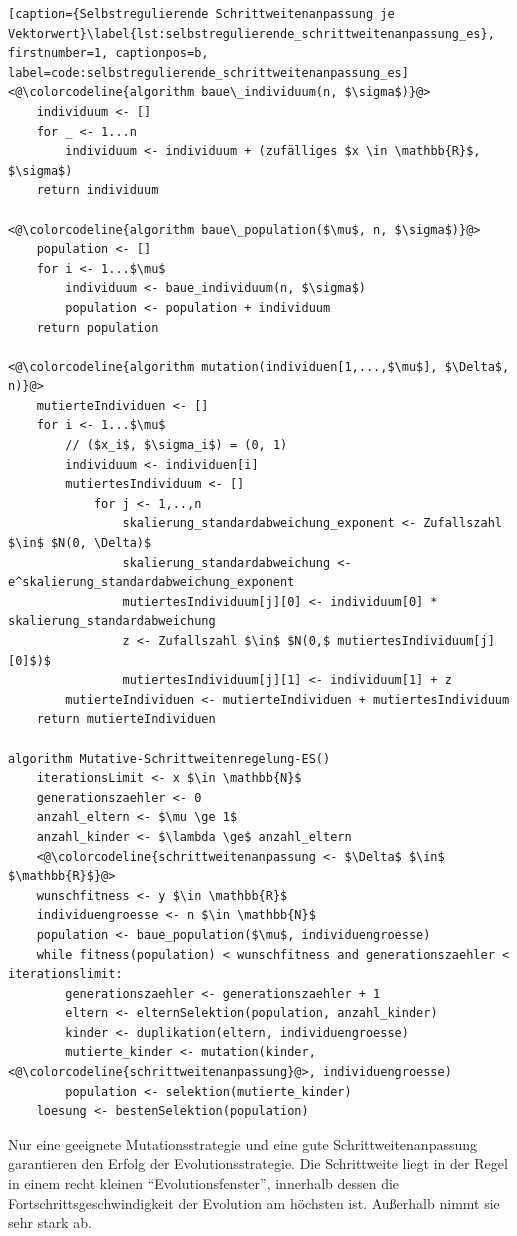 \begin{lstlisting}[caption={Selbstregulierende Schrittweitenanpassung je Vektorwert}\label{lst:selbstregulierende_schrittweitenanpassung_es}, firstnumber=1, captionpos=b, label=code:selbstregulierende_schrittweitenanpassung_es]
<@\colorcodeline{algorithm baue\_individuum(n, $\sigma$)}@>
	individuum <- []
	for _ <- 1...n
		individuum <- individuum + (zufälliges $x \in \mathbb{R}$, $\sigma$)
	return individuum
	
<@\colorcodeline{algorithm baue\_population($\mu$, n, $\sigma$)}@>
	population <- []
	for i <- 1...$\mu$
		individuum <- baue_individuum(n, $\sigma$)
		population <- population + individuum
	return population

<@\colorcodeline{algorithm mutation(individuen[1,...,$\mu$], $\Delta$, n)}@>
	mutierteIndividuen <- []
	for i <- 1...$\mu$
		// ($x_i$, $\sigma_i$) = (0, 1)
		individuum <- individuen[i]
		mutiertesIndividuum <- []
			for j <- 1,..,n
				skalierung_standardabweichung_exponent <- Zufallszahl $\in$ $N(0, \Delta)$
				skalierung_standardabweichung <- e^skalierung_standardabweichung_exponent
				mutiertesIndividuum[j][0] <- individuum[0] * skalierung_standardabweichung
				z <- Zufallszahl $\in$ $N(0,$ mutiertesIndividuum[j][0]$)$
				mutiertesIndividuum[j][1] <- individuum[1] + z
		mutierteIndividuen <- mutierteIndividuen + mutiertesIndividuum
	return mutierteIndividuen

algorithm Mutative-Schrittweitenregelung-ES()
	iterationsLimit <- x $\in \mathbb{N}$
	generationszaehler <- 0
	anzahl_eltern <- $\mu \ge 1$
	anzahl_kinder <- $\lambda \ge$ anzahl_eltern
	<@\colorcodeline{schrittweitenanpassung <- $\Delta$ $\in$ $\mathbb{R}$}@>
	wunschfitness <- y $\in \mathbb{R}$
	individuengroesse <- n $\in \mathbb{N}$
	population <- baue_population($\mu$, individuengroesse)
	while fitness(population) < wunschfitness and generationszaehler < iterationslimit:
		generationszaehler <- generationszaehler + 1
		eltern <- elternSelektion(population, anzahl_kinder)
		kinder <- duplikation(eltern, individuengroesse)
		mutierte_kinder <- mutation(kinder, <@\colorcodeline{schrittweitenanpassung}@>, individuengroesse)
		population <- selektion(mutierte_kinder)
	loesung <- bestenSelektion(population)
\end{lstlisting}

Nur eine geeignete Mutationsstrategie und eine gute Schrittweitenanpassung garantieren den Erfolg der Evolutionsstrategie.
Die Schrittweite liegt in der Regel in einem recht kleinen \enquote{Evolutionsfenster}, innerhalb dessen die Fortschrittsgeschwindigkeit der Evolution am höchsten ist. Außerhalb nimmt sie sehr stark ab.
